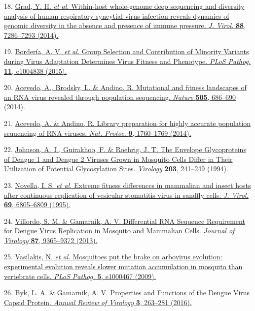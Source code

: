 \documentclass[
]{article}
\begin{document}
18. \href{http://paperpile.com/b/REZjPf/zRVIk}{Grad, Y. H. \emph{et al.}
Within-host whole-genome deep sequencing and diversity analysis of human
respiratory syncytial virus infection reveals dynamics of genomic
diversity in the absence and presence of immune pressure. \emph{J.
Virol.} \textbf{88}, 7286--7293 (2014).}

19. \href{http://paperpile.com/b/REZjPf/vDnrd}{Bordería, A. V. \emph{et
al.} Group Selection and Contribution of Minority Variants during Virus
Adaptation Determines Virus Fitness and Phenotype. \emph{PLoS Pathog.}
\textbf{11}, e1004838 (2015).}

20. \href{http://paperpile.com/b/REZjPf/bczFl}{Acevedo, A., Brodsky, L.
\& Andino, R. Mutational and fitness landscapes of an RNA virus revealed
through population sequencing. \emph{Nature} \textbf{505}, 686--690
(2014).}

21. \href{http://paperpile.com/b/REZjPf/CObqp}{Acevedo, A. \& Andino, R.
Library preparation for highly accurate population sequencing of RNA
viruses. \emph{Nat. Protoc.} \textbf{9}, 1760--1769 (2014).}

22. \href{http://paperpile.com/b/REZjPf/Bai6p}{Johnson, A. J.,
Guirakhoo, F. \& Roehrig, J. T. The Envelope Glycoproteins of Dengue 1
and Dengue 2 Viruses Grown in Mosquito Cells Differ in Their Utilization
of Potential Glycosylation Sites. \emph{Virology} \textbf{203}, 241--249
(1994).}

23. \href{http://paperpile.com/b/REZjPf/a4AV4}{Novella, I. S. \emph{et
al.} Extreme fitness differences in mammalian and insect hosts after
continuous replication of vesicular stomatitis virus in sandfly cells.
\emph{J. Virol.} \textbf{69}, 6805--6809 (1995).}

24. \href{http://paperpile.com/b/REZjPf/knFQ3}{Villordo, S. M. \&
Gamarnik, A. V. Differential RNA Sequence Requirement for Dengue Virus
Replication in Mosquito and Mammalian Cells. \emph{Journal of Virology}
\textbf{87}, 9365--9372 (2013).}

25. \href{http://paperpile.com/b/REZjPf/Mq62m}{Vasilakis, N. \emph{et
al.} Mosquitoes put the brake on arbovirus evolution: experimental
evolution reveals slower mutation accumulation in mosquito than
vertebrate cells. \emph{PLoS Pathog.} \textbf{5}, e1000467 (2009).}

26. \href{http://paperpile.com/b/REZjPf/4eMRo}{Byk, L. A. \& Gamarnik,
A. V. Properties and Functions of the Dengue Virus Capsid Protein.
\emph{Annual Review of Virology} \textbf{3}, 263--281 (2016).}
\end{document}
